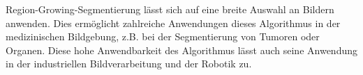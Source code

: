 Region-Growing-Segmentierung lässt sich auf eine breite Auswahl an Bildern anwenden. Dies ermöglicht zahlreiche Anwendungen dieses Algorithmus in der medizinischen Bildgebung, z.B. bei der Segmentierung von Tumoren oder Organen. Diese hohe Anwendbarkeit des Algorithmus lässt auch seine Anwendung in der industriellen Bildverarbeitung und der Robotik zu.\autocite[646]{adams_seeded_1994}